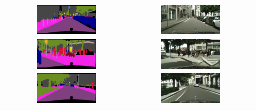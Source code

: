 \begin{longtable}{cc}
    \includegraphics[width=0.50\textwidth]{Chapters/figures/appendix/cityscapes/frankfurt_000001_014221_leftImg8bit_mask.png} &
    \includegraphics[width=0.50\textwidth]{Chapters/figures/appendix/cityscapes/frankfurt_000001_014221_leftImg8bit_sample.png} \\
    \includegraphics[width=0.50\textwidth]{Chapters/figures/appendix/cityscapes/frankfurt_000001_017459_leftImg8bit_mask.png} & \includegraphics[width=0.50\textwidth]{Chapters/figures/appendix/cityscapes/frankfurt_000001_017459_leftImg8bit_sample.png} \\
    \includegraphics[width=0.50\textwidth]{Chapters/figures/appendix/cityscapes/frankfurt_000001_023369_leftImg8bit_mask.png} & \includegraphics[width=0.50\textwidth]{Chapters/figures/appendix/cityscapes/frankfurt_000001_023369_leftImg8bit_sample.png} \\

\end{longtable}
